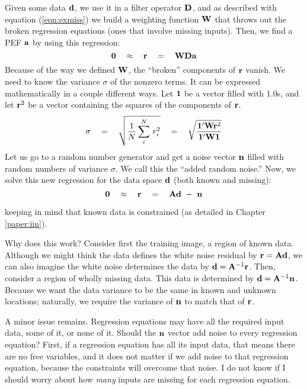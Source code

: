 \par
Given some data $\bold d$, we use it in a filter operator $\bold D$,
and as described with equation (\ref{eqn:exmiss}) we build
a weighting function $\bold W$ that throws out the
broken regression equations (ones that involve missing inputs).
Then, we find a PEF $\bold a$ by using this regression:
\begin{equation}
	\bold 0
\quad\approx\quad
	\bold r
\quad = \quad
	\bold W \bold D \bold a
\end{equation}
Because of the way we defined $\bold W$,
the ``broken'' components of $\bold r$ vanish.
We need to know the variance $\sigma$ of the nonzero terms.
It can be expressed mathematically in a couple different ways.
Let $\bold 1$ be a vector filled with 1.0s, and let
$\bold r^2$ be a vector containing the squares of the components of $\bold r$.
\begin{equation}
\sigma
\quad = \quad
	\sqrt{ {1\over N} \sum_i^N \,r_i^2 }
\quad = \quad
	\sqrt{
		\bold 1' \bold W \bold r^2
	\over
		\bold 1' \bold W \bold 1 
	}
\end{equation}
Let us go to a random number generator
and get a noise vector $\bold n$
filled with random numbers of variance $\sigma$.
We call this the ``added random noise.''
Now, we solve this new regression for
the data space $\bold d$ (both known and missing):
\begin{equation}
\bold 0
\quad\approx\quad
\bold r
\quad = \quad
\bold A \bold d   \ - \  \bold n
\label{eqn:noiseeverywhere}
\end{equation}
\par\noindent
keeping in mind that known data is constrained
(as detailed in Chapter \ref{paper:iin}).

\par
Why does this work?
Consider first the training image, a region of known data.
Although we might think the data defines the white noise
residual by $\bold r=\bold A\bold d$, we can also imagine the white noise
determines the data by $\bold d=\bold A^{-1}\bold r$.
Then, consider a region of wholly missing data.  This data
is determined by $\bold d=\bold A^{-1}\bold n$.
Because we want the data variance to be the same in known and unknown
locations; naturally, we require the variance of $\bold n$
to match that of $\bold r$.

\par
A minor issue remains.
Regression equations may have all the required input data,
some of it, or none of it.
Should the $\bold n$ vector add noise to every regression equation?
First, if a regression equation has all its input data,
that means there are no free variables, and it does not matter
if we add noise to that regression equation, because the constraints
will overcome that noise.
I do not know if I should worry about how
{\it many}
inputs are missing for each regression equation.

